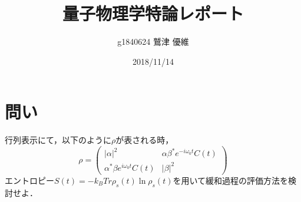 \documentclass[10pt]{ujarticle}
\title{量子物理学特論レポート}
\author{g1840624 鷲津 優維}
\date{2018/11/14}
\begin{document}
\maketitle
\section{問い}
行列表示にて，以下のように$\rho$が表される時，
\[
\rho = \left(
\begin{array}{cc}
|\alpha|^2 & \alpha \beta^{\ast} e^{-i\omega_0 t} C(t) \\
\alpha^{\ast} \beta e^{i\omega_0 t} C(t) & |\beta|^2
\end{array}
\right)
\]
エントロピー$S(t) = -k_B Tr \rho_s (t) \ln \rho_s(t)$を用いて緩和過程の評価方法を検討せよ．
\end{document}
